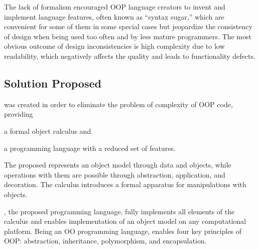 The lack of formalism encouraged OOP language creators to
invent and implement language features, often known as ``syntax sugar,''
which are convenient for some of them in some special cases but
jeopardize the consistency of design when being used too often
and by less mature programmers. The most obvious
outcome of design inconsistencies is high complexity due to low readability,
which negatively affects the quality and leads to functionality defects.

\subsection{Solution Proposed}

\eo{}
was created in order to eliminate the problem of complexity of
OOP code, providing
\begin{inparaenum}[1)]
  \item a formal object calculus and
  \item a programming language with a reduced set of features.
\end{inparaenum}
The proposed \phic{} represents an object model through
data and objects, while operations with them are possible
through abstraction, application, and decoration. The calculus
introduces a formal apparatus for manipulations with objects.

\eo{}, the proposed programming language, fully implements
all elements of the calculus and enables implementation of
an object model on any computational platform.
Being an OO programming language, \eo{} enables four key principles of OOP:
abstraction, inheritance, polymorphism, and encapsulation.

